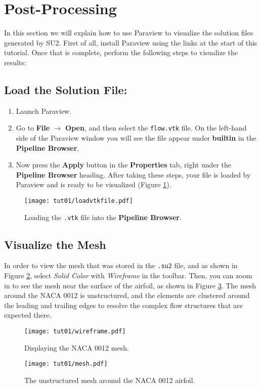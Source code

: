 \section{Post-Processing}
In this section we will explain how to use Paraview to visualize the solution files generated by SU2. First of all, install Paraview using the links at the start of this tutorial. Once that is complete, perform the following steps to visualize the results:
\subsection{Load the Solution File:}

\begin{enumerate}[label=\arabic*)]
    \item Launch Paraview.
    \item Go to \textbf{File} $\rightarrow$ \textbf{Open}, and then select the \texttt{flow.vtk} file. On the left-hand side of the Paraview window you will see the file appear under \textbf{builtin} in the \textbf{Pipeline Browser}.
    \item Now press the \textbf{Apply} button in the \textbf{Properties} tab, right under the \textbf{Pipeline Browser} heading. After taking these steps, your file is loaded by Paraview and is ready to be visualized (Figure \ref{fig1:load}).
\end{enumerate}
\begin{figure}[ht]
    \centering
    \texttt{[image: tut01/loadvtkfile.pdf]}
    \caption{Loading the \texttt{.vtk} file into the \textbf{Pipeline Browser}.}
    \label{fig1:load}
\end{figure}
\subsection{Visualize the Mesh}
In order to view the mesh that was stored in the \texttt{.su2} file, and as shown in Figure \ref{fig1:wireframe}, select \textit{Solid Color} with \textit{Wireframe} in the toolbar. Then, you can zoom in to see the mesh near the surface of the airfoil, as shown in Figure \ref{fig1:mesh}. The mesh around the NACA 0012 is unstructured, and the elements are clustered around the leading and trailing edges to resolve the complex flow structures that are expected there.
\begin{figure}[ht]
    \centering
    \texttt{[image: tut01/wireframe.pdf]}
    \caption{Displaying the NACA 0012 mesh.}
    \label{fig1:wireframe}
\end{figure}
\begin{figure}[ht]
    \centering
    \texttt{[image: tut01/mesh.pdf]}
    \caption{The unstructured mesh around the NACA 0012 airfoil.}
    \label{fig1:mesh}
\end{figure}
